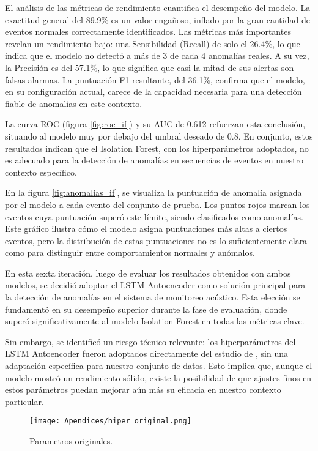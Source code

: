 El análisis de las métricas de rendimiento cuantifica el desempeño del modelo. La exactitud general del 89.9\% es un valor engañoso, inflado por la gran cantidad de eventos normales correctamente identificados. Las métricas más importantes revelan un rendimiento bajo: una Sensibilidad (Recall) de solo el 26.4\%, lo que indica que el modelo no detectó a más de 3 de cada 4 anomalías reales. A su vez, la Precisión es del 57.1\%, lo que significa que casi la mitad de sus alertas son falsas alarmas. La puntuación F1 resultante, del 36.1\%, confirma que el modelo, en su configuración actual, carece de la capacidad necesaria para una detección fiable de anomalías en este contexto.

La curva ROC (figura \ref{fig:roc_if}) y su AUC de 0.612 refuerzan esta conclusión, situando al modelo muy por debajo del umbral deseado de 0.8. En conjunto, estos resultados indican que el Isolation Forest, con los hiperparámetros adoptados, no es adecuado para la detección de anomalías en secuencias de eventos en nuestro contexto específico.

En la figura \ref{fig:anomalias_if}, se visualiza la puntuación de anomalía asignada por el modelo a cada evento del conjunto de prueba. Los puntos rojos marcan los eventos cuya puntuación superó este límite, siendo clasificados como anomalías. Este gráfico ilustra cómo el modelo asigna puntuaciones más altas a ciertos eventos, pero la distribución de estas puntuaciones no es lo suficientemente clara como para distinguir entre comportamientos normales y anómalos.


      En esta sexta iteración, luego de evaluar los resultados obtenidos con ambos modelos, se decidió adoptar el LSTM Autoencoder como solución principal para la detección de anomalías en el sistema de monitoreo acústico. Esta elección se fundamentó en su desempeño superior durante la fase de evaluación, donde superó significativamente al modelo Isolation Forest en todas las métricas clave.

      Sin embargo, se identificó un riesgo técnico relevante: los hiperparámetros del LSTM Autoencoder fueron adoptados directamente del estudio de \citeauthor{reis2025edge} \citeyear{reis2025edge}, sin una adaptación específica para nuestro conjunto de datos. Esto implica que, aunque el modelo mostró un rendimiento sólido, existe la posibilidad de que ajustes finos en estos parámetros puedan mejorar aún más su eficacia en nuestro contexto particular.
       \begin{figure}[ht!]
            \centering
            \texttt{[image: Apendices/hiper\_original.png]}
            \caption{Parametros originales.}
            \label{fig:parametros_originales}
      \end{figure}

